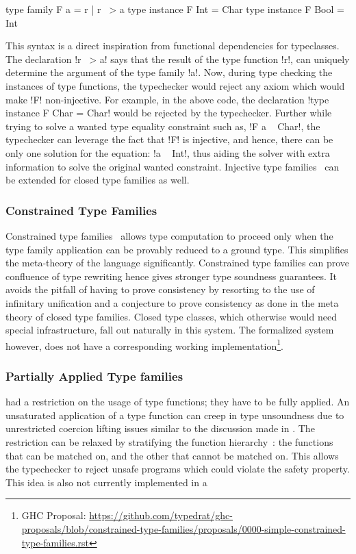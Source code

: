 \documentclass[screen,nonacm,manuscript,review]{acmart} %
\begin{document}
\begin{CenteredBox}
\begin{code}
type family F a = r | r ~> a
type instance F Int = Char
type instance F Bool = Int
\end{code}
\end{CenteredBox}
This syntax is a direct inspiration from functional dependencies for
typeclasses. The declaration !r ~> a! says that the result of the type
function !r!, can uniquely determine the argument of the type family
!a!. Now, during type checking the instances of type functions, the
typechecker would reject any axiom which would make !F!
non-injective. For example, in the above code, the declaration
!type instance F Char = Char! would be rejected by the typechecker. Further
while trying to solve a wanted type equality constraint such as,
!F a ~ Char!, the typechecker can leverage the fact that !F! is injective,
and hence, there can be only one solution for the equation: !a ~ Int!,
thus aiding the solver with extra information to solve the original
wanted constraint. Injective type
families~\cite{stolarek_injective_2015}
can be extended for closed type families as well.

\subsubsection{Constrained Type Families}
Constrained type families~\cite{morris_typefamilies_2017} allows type
computation to proceed only when the type family application can be
provably reduced to a ground type. This simplifies the meta-theory of
the language significantly. Constrained type families can prove
confluence of type rewriting hence gives stronger type soundness
guarantees. It avoids the pitfall of having to prove consistency by
resorting to the use of infinitary unification and a conjecture to
prove consistency as done in the meta theory of closed type families.
Closed type classes, which otherwise would need
special infrastructure, fall out naturally in this system. The
formalized system however, does not have a corresponding  working
implementation\footnote{GHC Proposal: \url{https://github.com/typedrat/ghc-proposals/blob/constrained-type-families/proposals/0000-simple-constrained-type-families.rst}}.

\subsubsection{Partially Applied Type families}
\SFC had a restriction on the usage of type functions; they have to
be fully applied. An unsaturated application of a type function can
creep in type unsoundness due to unrestricted coercion lifting issues
similar to the discussion made in \SFP. The restriction can be
relaxed by stratifying the function
hierarchy~\cite{kiss_higher-order_2019}: the functions that can be
matched on, and the other that cannot be matched on. This allows the
typechecker to reject unsafe programs which could violate the
safety property. This idea is also not currently implemented in a
\end{document}
